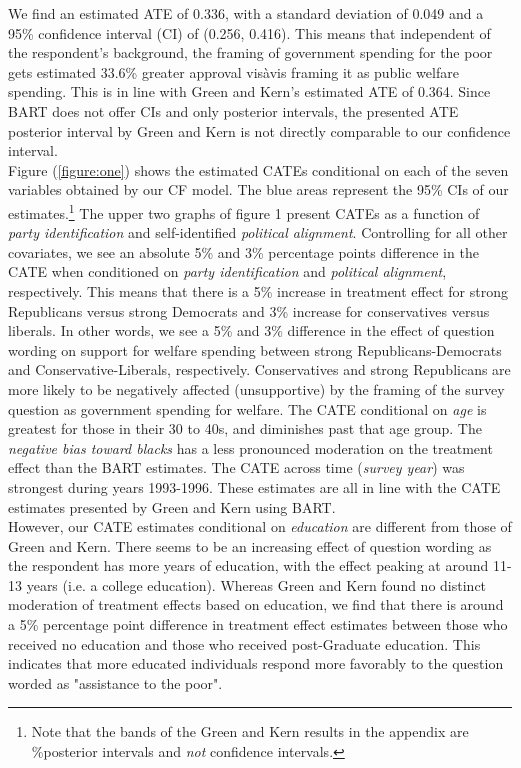 \documentclass[12pt]{article}
\begin{document}
We find an estimated ATE of 0.336, with a standard deviation of 0.049 and a 95\%
confidence interval (CI) of (0.256, 0.416). This means that independent of the respondent's background, the framing of government spending for the poor gets estimated 33.6\% greater approval vis\-à\-vis framing it as public welfare spending. This is in line with Green and
Kern's estimated ATE of 0.364. Since BART does not offer CIs and only posterior
intervals, the presented ATE posterior interval by Green and Kern is not directly
comparable to our confidence interval. 
\\

Figure (\ref{figure:one}) shows the estimated CATEs conditional on each of the seven variables
obtained by our CF model. The blue areas represent the 95\% CIs of our
estimates.\footnote{Note that the bands of the Green and Kern results in the appendix are \%posterior intervals and \textit{not} confidence intervals.}
The upper two graphs of figure 1 present CATEs as a function of \textit{party
identification} and self-identified \textit{political alignment}. Controlling
for all other covariates, we see an absolute 5\% and 3\% percentage points
difference in the CATE when conditioned on \textit{party identification} and
\textit{political alignment}, respectively. This means that there is a 5\%
increase in treatment effect for strong Republicans versus strong Democrats and
3\% increase for conservatives versus liberals. In other words, we see a 5\% and
3\% difference in the effect of question wording on support for welfare spending
between strong Republicans-Democrats and Conservative-Liberals, respectively.
Conservatives and strong Republicans are more likely to be negatively affected
(unsupportive) by the framing of the survey question as government spending for
welfare. The CATE conditional on \textit{age} is greatest for those in their 30
to 40s, and diminishes past that age group. The \textit{negative bias toward
blacks} has a less pronounced moderation on the treatment effect than the BART
estimates. The CATE across time (\textit{survey year}) was strongest during
years 1993-1996. These estimates are all in line with the CATE estimates
presented by Green and Kern using BART. \\

However, our CATE estimates conditional on \textit{education} are different from
those of Green and Kern. There seems to be an increasing effect of question
wording as the respondent has more years of education, with the effect peaking
at around 11-13 years (i.e. a college education). Whereas Green and Kern found
no distinct moderation of treatment effects based on education, we find that
there is around a 5\% percentage point difference in treatment effect estimates
between those who received no education and those who received post-Graduate
education. This indicates that more educated individuals respond more favorably
to the question worded as "assistance to the poor". \\
\end{document}
